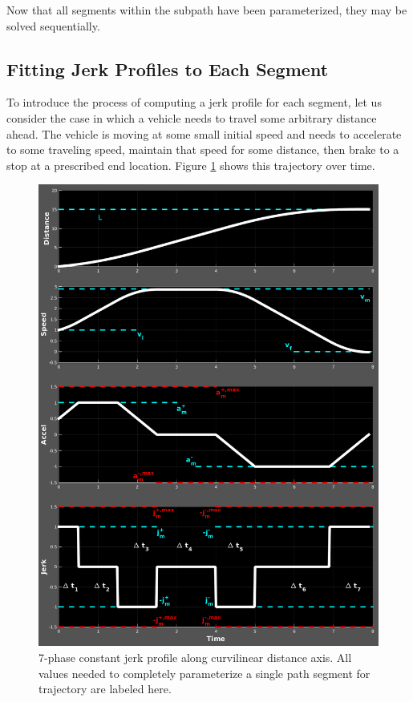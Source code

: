 \documentclass[letterpaper, 10 pt, conference]{ieeeconf}  %
\begin{document}
Now that all segments within the subpath have been parameterized, they may be solved sequentially.


\subsection{Fitting Jerk Profiles to Each Segment} \label{sec:jerkprofiles}

To introduce the process of computing a jerk profile for each segment, let us consider the case in which a vehicle needs to travel some arbitrary distance ahead.
The vehicle is moving at some small initial speed and needs to accelerate to some traveling speed, maintain that speed for some distance, then brake to a stop at a prescribed end location.
Figure \ref{fig:full7phasespec} shows this trajectory over time.

\begin{figure}[thpb]
  \centering
  \includegraphics[width=1.0\columnwidth]{graphics/Full7PhaseSpecVertical.png}
  \caption{
    7-phase constant jerk profile along curvilinear distance axis.
    All values needed to completely parameterize a single path segment for trajectory are labeled here.}
  \label{fig:full7phasespec}
\end{figure}
\end{document}
